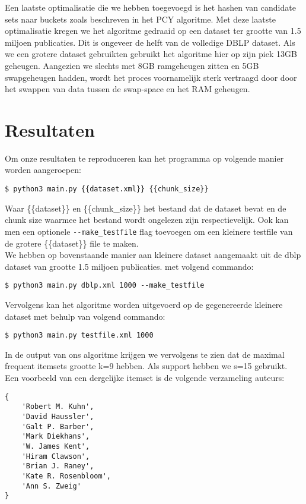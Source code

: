 \documentclass[11pt]{article}
\begin{document}
Een laatste optimalisatie die we hebben toegevoegd is het hashen van candidate sets naar buckets zoals beschreven in het PCY algoritme. Met deze laatste optimalisatie kregen we het algoritme gedraaid op een dataset ter grootte van 1.5 miljoen publicaties. Dit is ongeveer de helft van de volledige DBLP dataset. Als we een grotere dataset gebruikten gebruikt het algoritme hier op zijn piek 13GB geheugen. Aangezien we slechts met 8GB ramgeheugen zitten en 5GB swapgeheugen hadden, wordt het proces voornamelijk sterk vertraagd door door het swappen van data tussen de swap-space en het RAM geheugen. 


\section{Resultaten}

Om onze resultaten te reproduceren kan het programma op volgende manier worden aangeroepen:

\begin{verbatim}
$ python3 main.py {{dataset.xml}} {{chunk_size}}
\end{verbatim}

Waar \{\{dataset\}\} en \{\{chunk\_size\}\} het bestand dat de dataset bevat en de chunk size waarmee het bestand wordt ongelezen zijn respectievelijk. Ook kan men een optionele \texttt{-{}-make\_testfile} flag toevoegen om een kleinere testfile van de grotere \{\{dataset\}\} file te maken.\\

We hebben op bovenstaande manier aan kleinere dataset aangemaakt uit de dblp dataset van grootte 1.5 miljoen publicaties. met volgend commando:

\begin{verbatim}
$ python3 main.py dblp.xml 1000 --make_testfile
\end{verbatim}

Vervolgens kan het algoritme worden uitgevoerd op de gegenereerde kleinere dataset met behulp van volgend commando:

\begin{verbatim}
$ python3 main.py testfile.xml 1000
\end{verbatim}

In de output van ons algoritme krijgen we vervolgens te zien dat de maximal frequent itemsets grootte k=9 hebben. Als support hebben we s=15 gebruikt. Een voorbeeld van een dergelijke itemset is de volgende verzameling auteurs: 

\begin{verbatim}
{
    'Robert M. Kuhn', 
    'David Haussler', 
    'Galt P. Barber', 
    'Mark Diekhans',
    'W. James Kent', 
    'Hiram Clawson',
    'Brian J. Raney',
    'Kate R. Rosenbloom',
    'Ann S. Zweig'
}
\end{verbatim}
\end{document}
